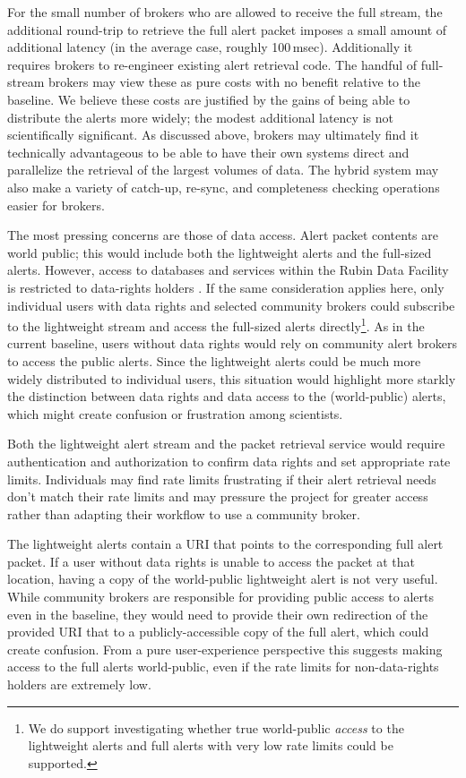 \documentclass[DM,authoryear,toc]{lsstdoc}
\begin{document}
For the small number of brokers who are allowed to receive the full stream, the additional round-trip to retrieve the full alert packet imposes a small amount of additional latency (in the average case, roughly 100\,msec).
Additionally it requires brokers to re-engineer existing alert retrieval code.
The handful of full-stream brokers may view these as pure costs with no benefit relative to the baseline.
We believe these costs are justified by the gains of being able to distribute the alerts more widely; the modest additional latency is not scientifically significant.
As discussed above, brokers may ultimately find it technically advantageous to be able to have their own systems direct and parallelize the retrieval of the largest volumes of data.
The hybrid system may also make a variety of catch-up, re-sync, and completeness checking operations easier for brokers.

The most pressing concerns are those of data access.
Alert packet contents are world public; this would include both the lightweight alerts and the full-sized alerts.
However, access to databases and services within the Rubin Data Facility is restricted to data-rights holders .
If the same consideration applies here, only individual users with data rights and selected community brokers could subscribe to the lightweight stream and access the full-sized alerts directly\footnote{We do support investigating whether true world-public \textit{access} to the lightweight alerts and full alerts with very low rate limits could be supported.}.
As in the current baseline, users without data rights would rely on community alert brokers to access the public alerts.
Since the lightweight alerts could be much more widely distributed to individual users, this situation would highlight more starkly the distinction between data rights and data access to the (world-public) alerts, which might create confusion or frustration among scientists.

Both the lightweight alert stream and the packet retrieval service would require authentication and authorization to confirm data rights and set appropriate rate limits.
Individuals may find rate limits frustrating if their alert retrieval needs don't match their rate limits and may pressure the project for greater access rather than adapting their workflow to use a community broker.

The lightweight alerts contain a URI that points to the corresponding full alert packet.
If a user without data rights is unable to access the packet at that location, having a copy of the world-public lightweight alert is not very useful.
While community brokers are responsible for providing public access to alerts even in the baseline, they would need to provide their own redirection of the provided URI that to a publicly-accessible copy of the full alert, which could create confusion.
From a pure user-experience perspective this suggests making access to the full alerts world-public, even if the rate limits for non-data-rights holders are extremely low.
\end{document}
